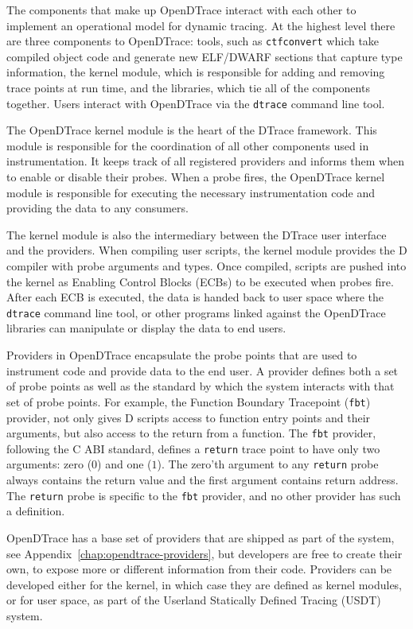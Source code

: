The components that make up OpenDTrace interact with each other to
implement an operational model for dynamic tracing.  At the highest
level there are three components to OpenDTrace: tools, such as
\texttt{ctfconvert} which take compiled object code and generate new
ELF/DWARF sections that capture type information, the kernel module,
which is responsible for adding and removing trace points at run time,
and the libraries, which tie all of the components together.  Users
interact with OpenDTrace via the \texttt{dtrace} command line tool.

The OpenDTrace kernel module is the heart of the DTrace
framework. This module is responsible for the coordination of all
other components used in instrumentation. It keeps track of all
registered providers and informs them when to enable or disable their
probes. When a probe fires, the OpenDTrace kernel module is
responsible for executing the necessary instrumentation code and
providing the data to any consumers.

The kernel module is also the intermediary between the DTrace user
interface and the providers. When compiling user scripts, the kernel
module provides the D compiler with probe arguments and types. Once
compiled, scripts are pushed into the kernel as Enabling Control Blocks
(ECBs) to be executed when probes fire. After each ECB is executed,
the data is handed back to user space where the \texttt{dtrace}
command line tool, or other programs linked against the OpenDTrace
libraries can manipulate or display the data to end users.

Providers in OpenDTrace encapsulate the probe points that are used to
instrument code and provide data to the end user. A provider defines
both a set of probe points as well as the standard by which the system
interacts with that set of probe points.  For example, the Function
Boundary Tracepoint (\texttt{fbt}) provider, not only gives D scripts
access to function entry points and their arguments, but also access
to the return from a function.  The \texttt{fbt} provider, following
the C ABI standard, defines a \texttt{return} trace point to have only
two arguments: zero ($0$) and one ($1$).  The zero'th argument to any
\texttt{return} probe always contains the return value and the first
argument contains return address.  The \texttt{return} probe is
specific to the \texttt{fbt} provider, and no other provider has such
a definition.

OpenDTrace has a base set of providers that are shipped as part of the
system, see Appendix~\ref{chap:opendtrace-providers}, but developers are free to
create their own, to expose more or different information from their
code. Providers can be developed either for the kernel, in which case
they are defined as kernel modules, or for user space, as part of the
Userland Statically Defined Tracing (USDT) system.

